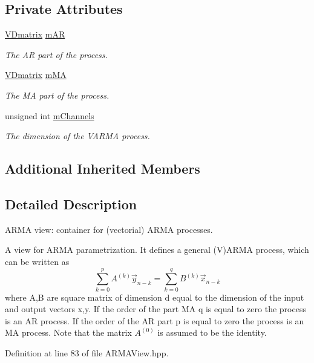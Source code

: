\subsection*{Private Attributes}
\begin{DoxyCompactItemize}
\item 
\hyperlink{namespacetsa_a6dd7105c3202ef00a213d7c029f5b248}{V\+Dmatrix} \hyperlink{classtsa_1_1_a_r_m_a_view_a0e95f26e07907a39ddb0e67b26fbc3ea}{m\+AR}
\begin{DoxyCompactList}\small\item\em The AR part of the process. \end{DoxyCompactList}\item 
\hyperlink{namespacetsa_a6dd7105c3202ef00a213d7c029f5b248}{V\+Dmatrix} \hyperlink{classtsa_1_1_a_r_m_a_view_a420b5083584d78e4bb7f5db8b3e62bc3}{m\+MA}
\begin{DoxyCompactList}\small\item\em The MA part of the process. \end{DoxyCompactList}\item 
unsigned int \hyperlink{classtsa_1_1_a_r_m_a_view_a0101f02d2c9f5eb2a6e6f1e1191fdb40}{m\+Channels}
\begin{DoxyCompactList}\small\item\em The dimension of the V\+A\+R\+MA process. \end{DoxyCompactList}\end{DoxyCompactItemize}
\subsection*{Additional Inherited Members}


\subsection{Detailed Description}
A\+R\+MA view\+: container for (vectorial) A\+R\+MA processes. 

A view for A\+R\+MA parametrization. It defines a general (V)A\+R\+MA process, which can be written as \[ \sum_{k=0}^{p} A^{(k)} \vec{y}_{n-k} = \sum_{k=0}^{q} B^{(k)} \vec{x}_{n-k} \] where A,B are square matrix of dimension d equal to the dimension of the input and output vectors x,y. If the order of the part MA q is equal to zero the process is an AR process. If the order of the AR part p is equal to zero the process is an MA process. Note that the matrix $A^{(0)}$ is assumed to be the identity. 

Definition at line 83 of file A\+R\+M\+A\+View.\+hpp.



